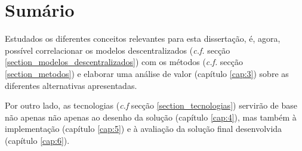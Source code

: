 \section{Sumário}
Estudados os diferentes conceitos relevantes para esta dissertação, é, agora, possível correlacionar os modelos descentralizados (\emph{c.f.} secção \ref{section_modelos_descentralizados}) com os métodos (\emph{c.f.} secção \ref{section_metodos}) e elaborar uma análise de valor (capítulo \ref{cap:3}) sobre as diferentes alternativas apresentadas.

Por outro lado, as tecnologias (\emph{c.f} secção \ref{section_tecnologias}) servirão de base não apenas não apenas ao desenho da solução (capítulo \ref{cap:4}), mas também à implementação (capítulo \ref{cap:5}) e à avaliação da solução final desenvolvida (capítulo \ref{cap:6}).






